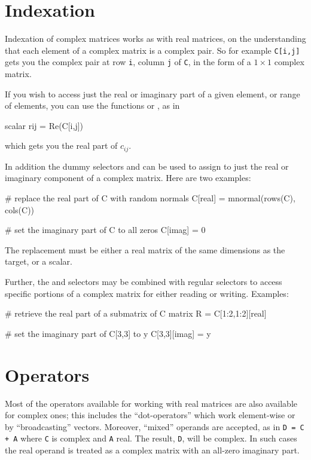 \section{Indexation}

Indexation of complex matrices works as with real matrices, on the
understanding that each element of a complex matrix is a complex
pair. So for example \texttt{C[i,j]} gets you the complex pair at row
\texttt{i}, column \texttt{j} of \texttt{C}, in the form of a
$1 \times 1$ complex matrix.

If you wish to access just the real or imaginary part of a given
element, or range of elements, you can use the functions 
or , as in
\begin{code}
scalar rij = Re(C[i,j])
\end{code}
which gets you the real part of $c_{ij}$.

In addition the dummy selectors  and  can be
used to assign to just the real or imaginary component of a complex
matrix. Here are two examples:
\begin{code}
# replace the real part of C with random normals
C[real] = mnormal(rows(C), cols(C))

# set the imaginary part of C to all zeros
C[imag] = 0
\end{code}
The replacement must be either a real matrix of the same dimensions as
the target, or a scalar.

Further, the  and  selectors may be combined
with regular selectors to access specific portions of a complex matrix
for either reading or writing. Examples:
\begin{code}
# retrieve the real part of a submatrix of C
matrix R = C[1:2,1:2][real]

# set the imaginary part of C[3,3] to y
C[3,3][imag] = y
\end{code}

\section{Operators}
\label{sec:cmplx-ops}

Most of the operators available for working with real matrices are
also available for complex ones; this includes the ``dot-operators''
which work element-wise or by ``broadcasting'' vectors. Moreover,
``mixed'' operands are accepted, as in \texttt{D = C + A} where
\texttt{C} is complex and \texttt{A} real. The result, \texttt{D},
will be complex. In such cases the real operand is treated as a
complex matrix with an all-zero imaginary part.

